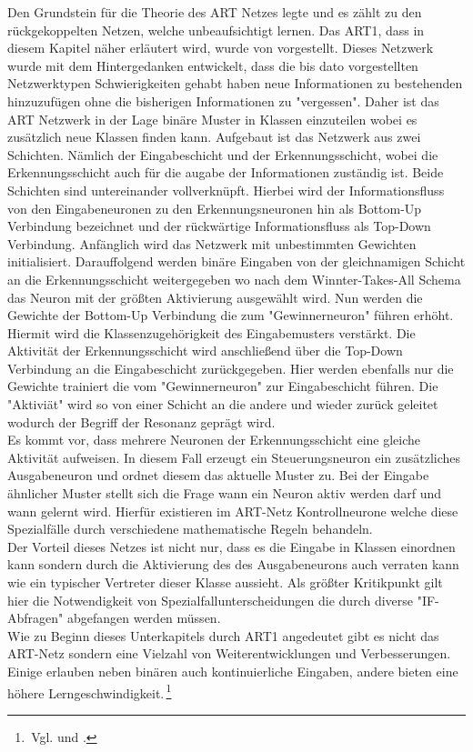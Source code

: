 Den Grundstein für die Theorie des ART Netzes legte \citet{Grossberg1973} und es zählt zu den rückgekoppelten Netzen, welche unbeaufsichtigt lernen. Das ART1, dass in diesem Kapitel näher erläutert wird, wurde von \citet{Carpenter1987} vorgestellt. Dieses Netzwerk wurde mit dem Hintergedanken entwickelt, dass die bis dato vorgestellten Netzwerktypen Schwierigkeiten gehabt haben neue Informationen zu bestehenden hinzuzufügen ohne die bisherigen Informationen zu "vergessen". Daher ist das ART Netzwerk in der Lage binäre Muster in Klassen einzuteilen wobei es zusätzlich neue Klassen finden kann. Aufgebaut ist das Netzwerk aus zwei Schichten. Nämlich der Eingabeschicht und der Erkennungsschicht, wobei die Erkennungsschicht auch für die augabe der Informationen zuständig ist. Beide Schichten sind untereinander vollverknüpft. Hierbei wird der Informationsfluss von den Eingabeneuronen zu den Erkennungsneuronen hin als Bottom-Up Verbindung bezeichnet und der rückwärtige Informationsfluss als Top-Down Verbindung. Anfänglich wird das Netzwerk mit unbestimmten Gewichten initialisiert. Darauffolgend werden binäre Eingaben von der gleichnamigen Schicht an die Erkennungsschicht weitergegeben wo nach dem Winnter-Takes-All Schema das Neuron mit der größten Aktivierung ausgewählt wird. Nun werden die Gewichte der Bottom-Up Verbindung die zum "Gewinnerneuron" führen erhöht. Hiermit wird die Klassenzugehörigkeit des Eingabemusters verstärkt. Die Aktivität der Erkennungsschicht wird anschließend über die Top-Down Verbindung an die Eingabeschicht zurückgegeben. Hier werden ebenfalls nur die Gewichte trainiert die vom "Gewinnerneuron" zur Eingabeschicht führen. Die "Aktiviät" wird so von einer Schicht an die andere und wieder zurück geleitet wodurch der Begriff der Resonanz geprägt wird.\\
Es kommt vor, dass mehrere Neuronen der Erkennungsschicht eine gleiche Aktivität aufweisen. In diesem Fall erzeugt ein Steuerungsneuron ein zusätzliches Ausgabeneuron und ordnet diesem das aktuelle Muster zu. Bei der Eingabe ähnlicher Muster stellt sich die Frage wann ein Neuron aktiv werden darf und wann gelernt wird. Hierfür existieren im ART-Netz Kontrollneurone welche diese Spezialfälle durch verschiedene mathematische Regeln behandeln.\\
Der Vorteil dieses Netzes ist nicht nur, dass es die Eingabe in Klassen einordnen kann sondern durch die Aktivierung des des Ausgabeneurons auch verraten kann wie ein typischer Vertreter dieser Klasse aussieht. Als größter Kritikpunkt gilt hier die Notwendigkeit von Spezialfallunterscheidungen die durch diverse "IF-Abfragen" abgefangen werden müssen.\,\\
Wie zu Beginn dieses Unterkapitels durch ART1 angedeutet gibt es nicht das ART-Netz sondern eine Vielzahl von Weiterentwicklungen und Verbesserungen. Einige erlauben neben binären auch kontinuierliche Eingaben, andere bieten eine höhere Lerngeschwindigkeit.\,\footnote{\,Vgl. \citet[C2.2:1 ff]{Fiesler96} und \citet[89 ff]{Gurney1997}.} 

